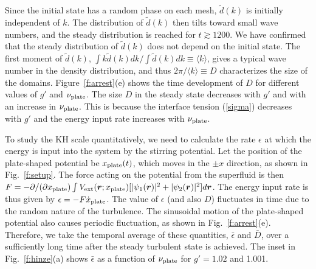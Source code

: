\documentclass[pra,aps,superscriptaddress,twocolumn]{revtex4-2}
\begin{document}
Since the initial state has a random phase on each mesh, $\tilde d(k)$ is
initially independent of $k$.
The distribution of $\tilde d(k)$ then tilts toward small wave numbers, and
the steady distribution is reached for $t \gtrsim 1200$.
We have confirmed that the steady distribution of $\tilde d(k)$ does not
depend on the initial state.
The first moment of $\tilde d(k)$, $\int k \tilde d(k) dk / \int \tilde d(k)
dk \equiv \langle k \rangle$, gives a typical wave number in the density
distribution, and thus $2\pi / \langle k \rangle \equiv D$ characterizes the
size of the domains.
Figure~\ref{f:arrest}(e) shows the time development of $D$ for different
values of $g'$ and $\nu_{\rm plate}$.
The size $D$ in the steady state decreases with $g'$ and with an increase in
$\nu_{\rm plate}$.
This is because the interface tension (\ref{sigma}) decreases with $g'$ and
the energy input rate increases with $\nu_{\rm plate}$.

To study the KH scale quantitatively, we need to calculate the rate
$\epsilon$ at which the energy is input into the system by the stirring
potential.
Let the position of the plate-shaped potential be $x_{\rm plate}(t)$, which
moves in the $\pm x$ direction, as shown in Fig.~\ref{f:setup}.
The force acting on the potential from the superfluid is then
$F = -\partial / (\partial x_{\rm plate}) \int
V_{\rm ext}(\bm{r}; x_{\rm plate}) [|\psi_1(\bm{r})|^2 + |\psi_2(\bm{r})|^2]
d\bm{r}$.
The energy input rate is thus given by $\epsilon = -F \dot x_{\rm plate}$.
The value of $\epsilon$ (and also $D$) fluctuates in time due to the random
nature of the turbulence.
The sinusoidal motion of the plate-shaped potential also causes periodic
fluctuation, as shown in Fig.~\ref{f:arrest}(e).
Therefore, we take the temporal average of these quantities, $\bar\epsilon$
and $\bar D$, over a sufficiently long time after the steady turbulent state
is achieved.
The inset in Fig.~\ref{f:hinze}(a) shows $\bar\epsilon$ as a function of
$\nu_{\rm plate}$ for $g' = 1.02$ and 1.001.
\end{document}
